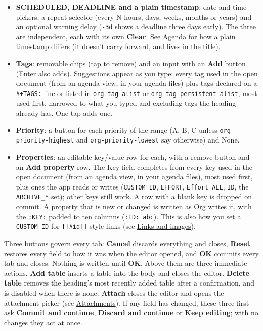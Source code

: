 \documentclass[11pt]{article}
\begin{document}
\begin{itemize}
\begin{itemize}
\item \textbf{SCHEDULED, DEADLINE and a plain timestamp}: date and time pickers, a repeat selector (every N hours, days, weeks, months or years) and an optional warning delay (\texttt{-3d} shows a deadline three days early). The three are independent, each with its own \textbf{Clear}. See \hyperref[sec:org38ac5a3]{Agenda} for how a plain timestamp differs (it doesn't carry forward, and lives in the title).
\item \textbf{Tags}: removable chips (tap to remove) and an input with an \textbf{Add} button (Enter also adds). Suggestions appear as you type: every tag used in the open document (from an agenda view, in your agenda files) plus tags declared on a \texttt{\#+TAGS:} line or listed in \texttt{org-tag-alist} or \texttt{org-tag-persistent-alist}, most used first, narrowed to what you typed and excluding tags the heading already has. One tap adds one.
\item \textbf{Priority}: a button for each priority of the range (A, B, C unless \texttt{org-priority-highest} and \texttt{org-priority-lowest} say otherwise) and None.
\item \textbf{Properties}: an editable key/value row for each, with a remove button and an \textbf{Add property} row. The Key field completes from every key used in the open document (from an agenda view, in your agenda files), most used first, plus ones the app reads or writes (\texttt{CUSTOM\_ID}, \texttt{EFFORT}, \texttt{Effort\_ALL}, \texttt{ID}, the \texttt{ARCHIVE\_*} set); other keys still work. A row with a blank key is dropped on commit. A property that is new or changed is written as Org writes it, with the \texttt{:KEY:} padded to ten columns (\texttt{:ID:       abc}). This is also how you set a \texttt{CUSTOM\_ID} for \texttt{[[\#id]]}-style links (see \hyperref[sec:org9659c7e]{Links and images}).
\end{itemize}

Three buttons govern every tab: \textbf{Cancel} discards everything and closes, \textbf{Reset} restores every field to how it was when the editor opened, and \textbf{OK} commits every tab and closes. Nothing is written until \textbf{OK}. Above them are three immediate actions. \textbf{Add table} inserts a table into the body and closes the editor. \textbf{Delete table} removes the heading's most recently added table after a confirmation, and is disabled when there is none. \textbf{Attach} closes the editor and opens the attachment picker (see \hyperref[sec:org970e59b]{Attachments}). If any field has changed, these three first ask \textbf{Commit and continue}, \textbf{Discard and continue} or \textbf{Keep editing}; with no changes they act at once.


\end{itemize}
\end{document}
